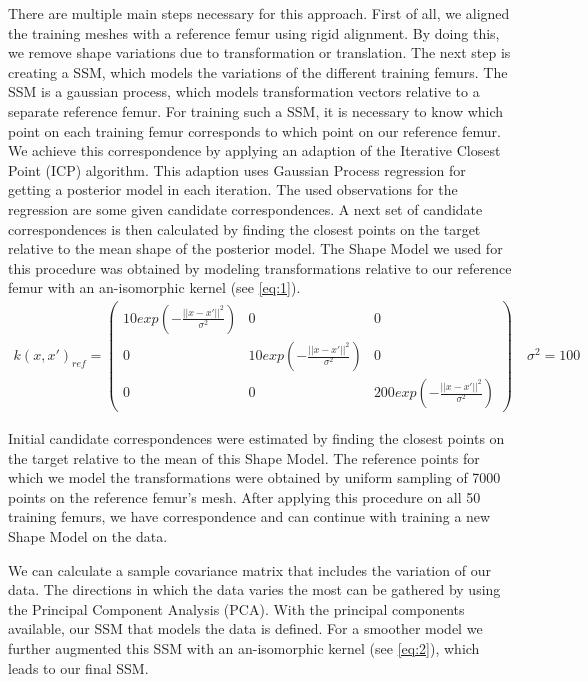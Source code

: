 \documentclass{article}
\begin{document}
	There are multiple main steps necessary for this approach. 
	First of all, we aligned the training meshes with a reference femur using rigid alignment.
	By doing this, we remove shape variations due to transformation or translation. 
	The next step is creating a SSM, which models the variations of the different training femurs.
	The SSM is a gaussian process, which models transformation vectors relative to a separate reference femur.
	For training such a SSM, it is necessary to know which point on each training femur corresponds to which point on our reference femur. 
	We achieve this correspondence by applying an adaption of the Iterative Closest Point (ICP) algorithm. 
	This adaption uses Gaussian Process regression for getting a posterior model in each iteration.
	The used observations for the regression are some given candidate correspondences. 
	A next set of candidate correspondences is then calculated by finding the closest points on the target relative to the mean shape of the posterior model.
	The Shape Model we used for this procedure was obtained by modeling transformations relative to our reference femur with an an-isomorphic kernel (see \autoref{eq:1}).
	\begin{align}
	k(x, x')_{ref} =
	\begin{pmatrix}
	10 exp(-\frac{||x-x'||^2}{\sigma^2})       & 0 & 0 \\
	0      & 10 exp(-\frac{||x-x'||^2}{\sigma^2}) & 0  \\
	0      & 0 &  200 exp(-\frac{||x-x'||^2}{\sigma^2})
	\end{pmatrix}
	\quad \sigma^2 = 100 
	\label{eq:1}
	\end{align}
	
	Initial candidate correspondences were estimated by finding the closest points on the target relative to the mean of this Shape Model.
	The reference points for which we model the transformations were obtained by uniform sampling of 7000 points on the reference femur's mesh.
	After applying this procedure on all 50 training femurs, we have correspondence and can continue with training a new Shape Model on the data.
	
	We can calculate a sample covariance matrix that includes the variation of our data. The directions in which the data varies the most can be gathered by using the Principal Component Analysis (PCA). With the principal components available, our SSM that models the data is defined. For a smoother model we further augmented this SSM with an an-isomorphic kernel (see \autoref{eq:2}), which leads to our final SSM.
	
\end{document}
